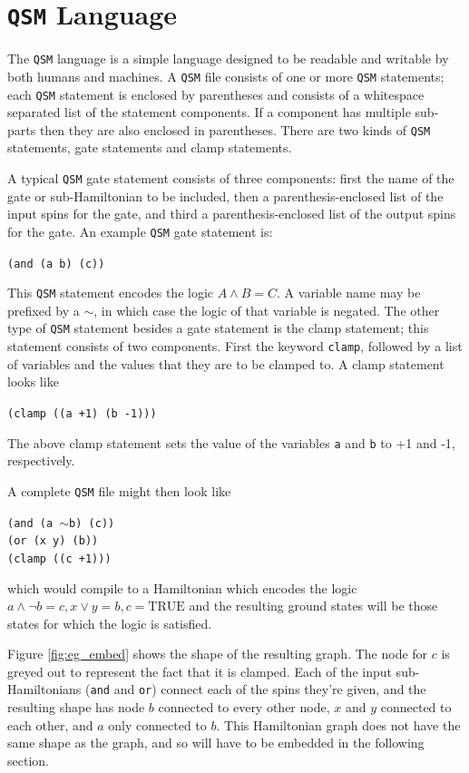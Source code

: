 \section{\texttt{QSM} Language}
The \texttt{QSM} language is a simple language designed to be readable and writable by both humans and machines.  A \texttt{QSM} file consists of one or more \texttt{QSM} statements; each \texttt{QSM} statement is enclosed by parentheses and consists of a whitespace separated list of the statement components.  If a component has multiple sub-parts then they are also enclosed in parentheses.  There are two kinds of \texttt{QSM} statements, gate statements and clamp statements.

A typical \texttt{QSM} gate statement consists of three components: first the name of the gate or sub-Hamiltonian to be included, then a parenthesis-enclosed list of the input spins for the gate, and third a parenthesis-enclosed list of the output spins for the gate.  An example \texttt{QSM} gate statement is: 
\begin{center}
	\texttt{(and (a b) (c))}
\end{center}
This \texttt{QSM} statement encodes the logic $A \wedge B = C$.  A variable name may be prefixed by a $\sim$, in which case the logic of that variable is negated.  The other type of \texttt{QSM} statement besides a gate statement is the clamp statement; this statement consists of two components.  First the keyword \texttt{clamp}, followed by a list of variables and the values that they are to be clamped to.  A clamp statement looks like
\begin{center}
	\texttt{(clamp ((a +1) (b -1)))}
\end{center}
The above clamp statement sets the value of the variables \texttt{a} and \texttt{b} to +1 and -1, respectively.

A complete \texttt{QSM} file might then look like

\begin{center}
	\texttt{(and (a $\sim$b) (c))}\\
	\texttt{(or (x y) (b))}\\
	\texttt{(clamp ((c +1)))}
\end{center}
which would compile to a Hamiltonian which encodes the logic $a \wedge \neg b = c, x \vee y = b, c = \text{TRUE}$ and the resulting ground states will be those states for which the logic is satisfied.

Figure \ref{fig:eg_embed} shows the shape of the resulting graph.  The node for $c$ is greyed out to represent the fact that it is clamped.  Each of the input sub-Hamiltonians (\texttt{and} and \texttt{or}) connect each of the spins they're given, and the resulting shape has node $b$ connected to every other node, $x$ and $y$ connected to each other, and $a$ only connected to $b$.  This Hamiltonian graph does not have the same shape as the \machine graph, and so will have to be embedded in the following section.


